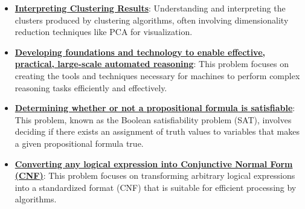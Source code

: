 \documentclass{article}%
\begin{document}
\begin{itemize}[leftmargin=*]
\item \href{https://purdue.brightspace.com/d2l/common/assets/pdfjs-d2l-dist/1.0.14-legacy/web/viewer.html?file=\%2Fcontent\%2Fenforced\%2F1095467-wl.202510.CS.24300.001\%2F12L2-distance-clusters.pdf\%3Fou\%3D1095467\&lang=en-us\&container=d2l-fileviewer-rendered-pdf\&fullscreen=d2l-fileviewer-rendered-pdf-dialog\&height=667#page=36}{\textbf{Interpreting Clustering Results}}: Understanding and interpreting the clusters produced by clustering algorithms, often involving dimensionality reduction techniques like PCA for visualization.%
\end{itemize}%
\begin{itemize}[leftmargin=*]%
\item \href{https://purdue.brightspace.com/d2l/common/assets/pdfjs-d2l-dist/1.0.14-legacy/web/viewer.html?file=\%2Fcontent\%2Fenforced\%2F1095467-wl.202510.CS.24300.001\%2F13L1-Logic.pdf\%3Fou\%3D1095467\&lang=en-us\&container=d2l-fileviewer-rendered-pdf\&fullscreen=d2l-fileviewer-rendered-pdf-dialog\&height=667#page=4}{\textbf{Developing foundations and technology to enable effective, practical, large{-}scale automated reasoning}}: This problem focuses on creating the tools and techniques necessary for machines to perform complex reasoning tasks efficiently and effectively.%
\item \href{https://purdue.brightspace.com/d2l/common/assets/pdfjs-d2l-dist/1.0.14-legacy/web/viewer.html?file=\%2Fcontent\%2Fenforced\%2F1095467-wl.202510.CS.24300.001\%2F13L1-Logic.pdf\%3Fou\%3D1095467\&lang=en-us\&container=d2l-fileviewer-rendered-pdf\&fullscreen=d2l-fileviewer-rendered-pdf-dialog\&height=667#page=15}{\textbf{Determining whether or not a propositional formula is satisfiable}}: This problem, known as the Boolean satisfiability problem (SAT), involves deciding if there exists an assignment of truth values to variables that makes a given propositional formula true.%
\item \href{https://purdue.brightspace.com/d2l/common/assets/pdfjs-d2l-dist/1.0.14-legacy/web/viewer.html?file=\%2Fcontent\%2Fenforced\%2F1095467-wl.202510.CS.24300.001\%2F13L1-Logic.pdf\%3Fou\%3D1095467\&lang=en-us\&container=d2l-fileviewer-rendered-pdf\&fullscreen=d2l-fileviewer-rendered-pdf-dialog\&height=667#page=17}{\textbf{Converting any logical expression into Conjunctive Normal Form (CNF)}}: This problem focuses on transforming arbitrary logical expressions into a standardized format (CNF) that is suitable for efficient processing by algorithms.%
\end{itemize}%
\end{document}
